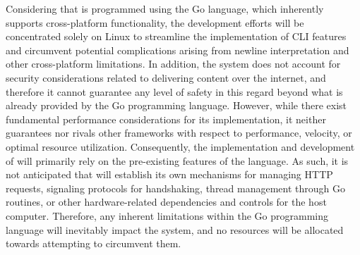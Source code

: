 {}\markdownRendererInterblockSeparator
{}Considering that  is programmed using the Go language, which inherently supports cross-platform functionality, the development efforts will be concentrated solely on Linux to streamline the implementation of CLI features and circumvent potential complications arising from newline interpretation and other cross-platform limitations.\markdownRendererInterblockSeparator
{}In addition, the system does not account for security considerations related to delivering content over the internet, and therefore it cannot guarantee any level of safety in this regard beyond what is already provided by the Go programming language.\markdownRendererInterblockSeparator
{}However, while there exist fundamental performance considerations for its implementation, it neither guarantees nor rivals other frameworks with respect to performance, velocity, or optimal resource utilization.\markdownRendererInterblockSeparator
{}Consequently, the implementation and development of  will primarily rely on the pre-existing features of the language. As such, it is not anticipated that  will establish its own mechanisms for managing HTTP requests, signaling protocols for handshaking, thread management through Go routines, or other hardware-related dependencies and controls for the host computer. Therefore, any inherent limitations within the Go programming language will inevitably impact the system, and no resources will be allocated towards attempting to circumvent them.\markdownRendererDocumentEnd